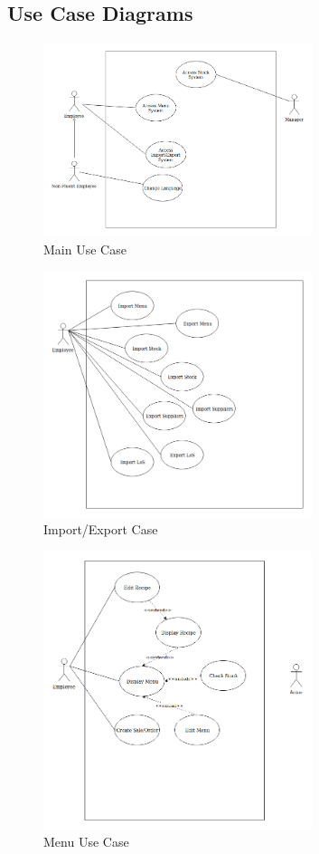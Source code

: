 \subsection{Use Case Diagrams}
\begin{figure}[!htb]
	\centering
	\includegraphics[width=0.7\textwidth]{main_case}
	\caption{Main Use Case}
	\label{fig:maincase}
\end{figure}
\begin{figure}[!htb]
	\centering
	\includegraphics[width=0.7\textwidth]{import_export_case}
	\caption{Import/Export Case}
	\label{fig:iocase}
\end{figure}
\begin{figure}[!htb]
	\centering
	\includegraphics[width=0.7\textwidth]{menu_case}
	\caption{Menu Use Case}
	\label{fig:menucase}
\end{figure}

